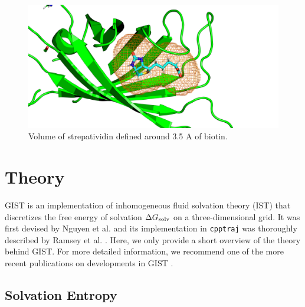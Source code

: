 \documentclass[9pt,tutorial]{livecoms}
\newcommand{\dgsolv}{\Delta G_\textup{solv}}
\newcommand{\software}{\texttt}
\begin{document}
\begin{figure}
	\centering
	\includegraphics[width=1.0\linewidth]{streptavidin_bp_close.png}
	\caption{Volume of strepatividin defined around 3.5 A of biotin. }\label{streptavidin_bp_close}
\end{figure}

\section{Theory}
\label{sec:theory}
GIST is an implementation of inhomogeneous fluid solvation theory (IST) \cite{Lazaridis1998} that discretizes the free energy of solvation $\dgsolv$ on a three-dimensional grid. 
It was first devised by Nguyen et al. \cite{Nguyen2012} and its implementation in \software{cpptraj} was thoroughly described by Ramsey et al. \cite{Ramsey2016}. %
Here, we only provide a short overview of the theory behind GIST.
For more detailed information, we recommend one of the more recent publications on developments in GIST \cite{Kraml2020,Chen2021}.

\subsection{Solvation Entropy}

\end{document}
